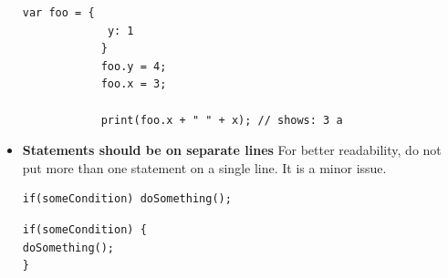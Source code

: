 \begin{itemize}
\begin{lstlisting}[caption=Compliant Solution]
			var foo = {
			 y: 1
			}
			foo.y = 4;
			foo.x = 3;
			
			print(foo.x + " " + x); // shows: 3 a
			\end{lstlisting}
			
		
	\item \textbf{Statements should be on separate lines}
	For better readability, do not put more than one statement on a single line. It is a minor issue.
	
	\begin{lstlisting}[caption=Noncompliant Code Example]
	if(someCondition) doSomething();
	\end{lstlisting}
	
	\begin{lstlisting}[caption=Compliant Solution]
if(someCondition) {
doSomething();
}
	\end{lstlisting}
	
	
\end{itemize}
